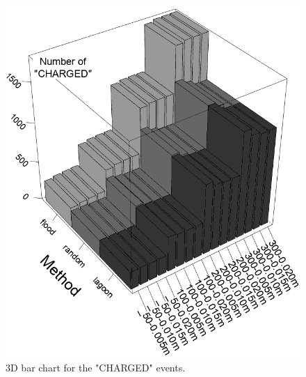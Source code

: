\documentclass[12pt, oneandhalf, chaparabic, sees, ms]{metu}
\begin{document}
\begin{minipage}[t]{0.57\textwidth}
\centering
\begin{figure}[H]
  \includegraphics[width=\textwidth]{3dcharges2.png}
  \caption{3D bar chart for the "CHARGED" events.}
 \label{fig:recharges3d}
\end{figure}
\end{minipage}
\end{document}
